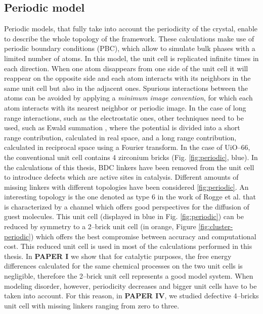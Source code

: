 \subsection*{Periodic model}
Periodic models, that fully take into account the periodicity of the crystal, enable to describe the whole topology of the framework. These calculations make use of periodic boundary conditions (PBC), which allow to simulate bulk phases with a limited number of atoms. In this model, the unit cell is replicated infinite times in each direction. When one atom disappears from one side of the unit cell it will reappear on the opposite side and each atom interacts with its neighbors in the same unit cell but also in the adjacent ones. Spurious interactions between the atoms can be avoided by applying a \textit{minimum image convention}, for which each atom interacts with its nearest neighbor or periodic image. In the case of long range interactions, such as the electrostatic ones, other techniques need to be used, such as Ewald summation \cite{Ewald1921}, where the potential is divided into a short range contribution, calculated in real space, and a long range contribution, calculated in reciprocal space using a Fourier transform. 
\npar
In the case of UiO--66, the conventional unit cell\cite{cavka2008new} contains 4 zirconium bricks (Fig. \ref{fig:periodic}, blue). In the calculations of this thesis, BDC linkers have been removed from the unit cell to introduce defects which are active sites in catalysis. Different amounts of missing linkers with different topologies have been considered \ref{fig:periodic}. An interesting topology is the one denoted as type 6 in the work of Rogge et al.\cite{rogge2017metal} that is characterized by a channel which offers good perspectives for the diffusion of guest molecules. This unit cell (displayed in blue in Fig. \ref{fig:periodic}) can be reduced by symmetry to a 2--brick unit cell (in orange, Figure \ref{fig:cluster-periodic}) which offers the best compromise between accuracy and computational cost. This reduced unit cell is used in most of the calculations performed in this thesis. In \textbf{PAPER I} we show that for catalytic purposes, the free energy differences calculated for the same chemical processes on the two unit cells is negligible, therefore the 2--brick unit cell represents a good model system. When modeling disorder, however, periodicity decreases and bigger unit cells have to be taken into account. For this reason, in \textbf{PAPER IV}, we studied defective 4--bricks unit cell with missing linkers ranging from zero to three. 

